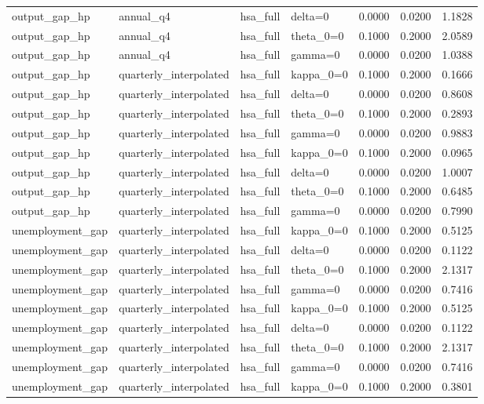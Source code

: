 \begin{tabular}{llllrrr}
output\_gap\_hp & annual\_q4 & hsa\_full & delta=0 & 0.0000 & 0.0200 & 1.1828 \\
output\_gap\_hp & annual\_q4 & hsa\_full & theta\_0=0 & 0.1000 & 0.2000 & 2.0589 \\
output\_gap\_hp & annual\_q4 & hsa\_full & gamma=0 & 0.0000 & 0.0200 & 1.0388 \\
output\_gap\_hp & quarterly\_interpolated & hsa\_full & kappa\_0=0 & 0.1000 & 0.2000 & 0.1666 \\
output\_gap\_hp & quarterly\_interpolated & hsa\_full & delta=0 & 0.0000 & 0.0200 & 0.8608 \\
output\_gap\_hp & quarterly\_interpolated & hsa\_full & theta\_0=0 & 0.1000 & 0.2000 & 0.2893 \\
output\_gap\_hp & quarterly\_interpolated & hsa\_full & gamma=0 & 0.0000 & 0.0200 & 0.9883 \\
output\_gap\_hp & quarterly\_interpolated & hsa\_full & kappa\_0=0 & 0.1000 & 0.2000 & 0.0965 \\
output\_gap\_hp & quarterly\_interpolated & hsa\_full & delta=0 & 0.0000 & 0.0200 & 1.0007 \\
output\_gap\_hp & quarterly\_interpolated & hsa\_full & theta\_0=0 & 0.1000 & 0.2000 & 0.6485 \\
output\_gap\_hp & quarterly\_interpolated & hsa\_full & gamma=0 & 0.0000 & 0.0200 & 0.7990 \\
unemployment\_gap & quarterly\_interpolated & hsa\_full & kappa\_0=0 & 0.1000 & 0.2000 & 0.5125 \\
unemployment\_gap & quarterly\_interpolated & hsa\_full & delta=0 & 0.0000 & 0.0200 & 0.1122 \\
unemployment\_gap & quarterly\_interpolated & hsa\_full & theta\_0=0 & 0.1000 & 0.2000 & 2.1317 \\
unemployment\_gap & quarterly\_interpolated & hsa\_full & gamma=0 & 0.0000 & 0.0200 & 0.7416 \\
unemployment\_gap & quarterly\_interpolated & hsa\_full & kappa\_0=0 & 0.1000 & 0.2000 & 0.5125 \\
unemployment\_gap & quarterly\_interpolated & hsa\_full & delta=0 & 0.0000 & 0.0200 & 0.1122 \\
unemployment\_gap & quarterly\_interpolated & hsa\_full & theta\_0=0 & 0.1000 & 0.2000 & 2.1317 \\
unemployment\_gap & quarterly\_interpolated & hsa\_full & gamma=0 & 0.0000 & 0.0200 & 0.7416 \\
unemployment\_gap & quarterly\_interpolated & hsa\_full & kappa\_0=0 & 0.1000 & 0.2000 & 0.3801 \\

\end{tabular}

